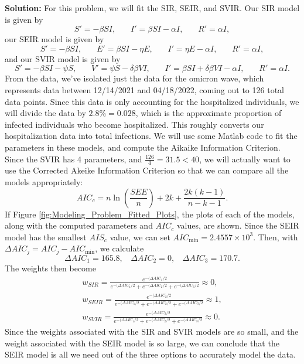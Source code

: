 \documentclass{article}
\renewcommand{\l}{\left}
\renewcommand{\r}{\right}
\begin{document}
\textbf{Solution: }For this problem, we will fit the SIR, SEIR, and SVIR. Our SIR model is given by
\[ S' = -\beta SI, ~~~~~~~~ I' = \beta SI - \alpha I, ~~~~~~~~ R' = \alpha I, \]
our SEIR model is given by
\[ S' = -\beta SI, ~~~~~~~~E' = \beta SI - \eta E,~~~~~~~~ I' = \eta E - \alpha I, ~~~~~~~~ R' = \alpha I, \]
and our SVIR model is given by 
\[ S' = -\beta SI-\psi S, ~~~~~~~~V' = \psi S - \delta \beta VI,~~~~~~~~ I' = \beta SI + \delta \beta VI - \alpha I, ~~~~~~~~ R' = \alpha I. \]
From the data, we've isolated just the data for the omicron wave, which represents data between 12/14/2021 and 04/18/2022, coming out to 126 total data points. Since this data is only accounting for the hospitalized individuals, we will divide the data by $2.8\%=0.028$, which is the approximate proportion of infected individuals who become hospitalized. This roughly converts our hospitalization data into total infections. We will use some Matlab code to fit the parameters in these models, and compute the Aikaike Information Criterion. Since the SVIR has 4 parameters, and $\frac{126}{4} = 31.5 < 40$, we will actually want to use the Corrected Akeike Information Criterion so that we can compare all the models appropriately:
\[ AIC_{c} = n \ln \l( \frac{SEE}{n} \r) + 2k + \frac{2k(k-1)}{n-k-1}. \]
If Figure \ref{fig:Modeling_Problem_Fitted_Plots}, the plots of each of the models, along with the computed parameters and $AIC_c$ values, are shown. Since the SEIR model has the smallest $AIS_c$ value, we can set $AIC_{\text{min}} = 2.4557\times 10^{3}$. Then, with $\Delta AIC_j = AIC_j - AIC_{\text{min}}$, we calculate
\[ \Delta AIC_1 = 165.8,~~~~\Delta AIC_2 = 0, ~~~~ \Delta AIC_3 = 170.7. \]
The weights then become 
\begin{align*}
    w_{SIR} = \frac{e^{-(\Delta AIC_{1}/2}}{e^{-(\Delta AIC_{1}/2}+e^{-(\Delta AIC_{2}/2}+e^{-(\Delta AIC_{3}/2}} \approx 0, \\
    w_{SEIR} = \frac{e^{-(\Delta AIC_{2}/2}}{e^{-(\Delta AIC_{1}/2}+e^{-(\Delta AIC_{2}/2}+e^{-(\Delta AIC_{3}/2}} \approx 1, \\
    w_{SVIR} = \frac{e^{-(\Delta AIC_{3}/2}}{e^{-(\Delta AIC_{1}/2}+e^{-(\Delta AIC_{2}/2}+e^{-(\Delta AIC_{3}/2}} \approx 0.
\end{align*}
Since the weights associated with the SIR and SVIR models are so small, and the weight associated with the SEIR model is so large, we can conclude that the SEIR model is all we need out of the three options to accurately model the data.
\end{document}
